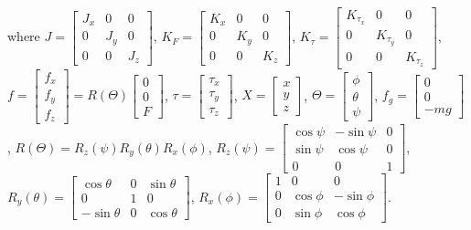 \documentclass{ieeeaccess}
\begin{document}
where $J=\begin{bmatrix}
    J_{x} & 0 & 0 \\
    0 & J_{y} & 0 \\
    0 & 0 & J_{z}
\end{bmatrix}$, $K_F=\begin{bmatrix}
    K_{x} & 0 & 0 \\
    0 & K_{y} & 0 \\
    0 & 0 & K_{z}
\end{bmatrix}$, $K_\tau=\begin{bmatrix}
    K_{\tau_x} & 0 & 0 \\
    0 & K_{\tau_y} & 0 \\
    0 & 0 & K_{\tau_z}
\end{bmatrix}$, $f =\begin{bmatrix}
    f_x \\ f_y \\ f_z
\end{bmatrix} = R(\Theta)\begin{bmatrix}
    0 \\ 0 \\ F
\end{bmatrix}$, $\tau=\begin{bmatrix}
    \tau_x \\ \tau_y \\ \tau_z
\end{bmatrix}$, $X=\begin{bmatrix}
    x \\ y \\ z
\end{bmatrix}$, $\Theta=\begin{bmatrix}
    \phi \\ \theta \\ \psi
\end{bmatrix}$, $f_g=\begin{bmatrix}
    0 \\ 0 \\ -mg
\end{bmatrix}$, $R(\Theta)=R_z(\psi)R_y(\theta)R_x(\phi)$, $R_z(\psi)=\begin{bmatrix} %
    \cos\psi & -\sin\psi & 0 \\
    \sin\psi & \cos\psi & 0 \\
    0 & 0 & 1
\end{bmatrix}$, $R_y(\theta)=\begin{bmatrix}
    \cos\theta & 0 & \sin\theta \\
    0 & 1 & 0 \\
    -\sin\theta & 0 & \cos\theta
\end{bmatrix}$, $R_x(\phi)=\begin{bmatrix}
    1 & 0 & 0 \\
    0 & \cos\phi & -\sin\phi \\
    0 & \sin\phi & \cos\phi
\end{bmatrix}$.
\end{document}
